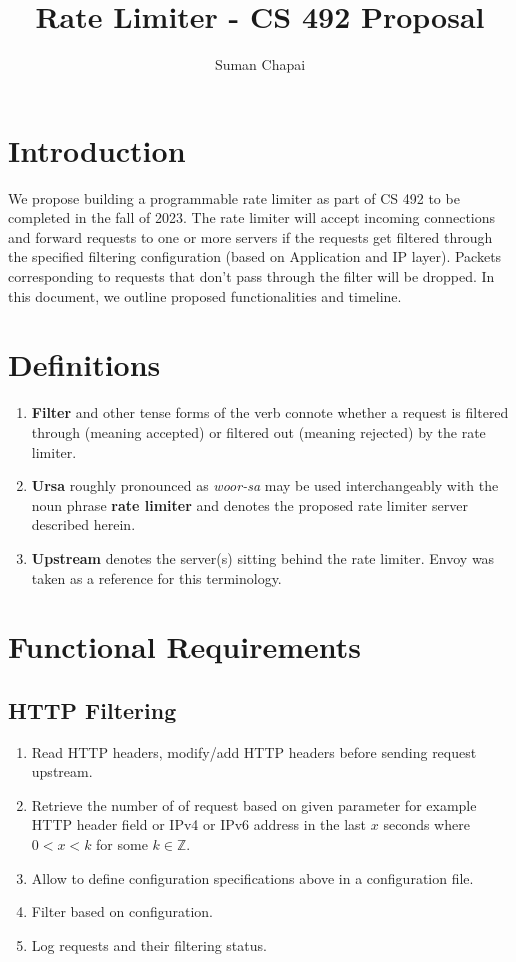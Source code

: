 \documentclass{article}
\author{Suman Chapai}
\title{Rate Limiter - CS 492 Proposal}
\newcommand*{\Z}[0]{\mathbb{Z}}
\begin{document}
\maketitle



%
%
\section{Introduction}
We propose building a programmable rate limiter as part of CS 492 to be
completed in the fall of 2023. The rate limiter will accept incoming connections
and forward requests to one or more servers if the requests get filtered through
the specified filtering configuration (based on Application and IP layer).
Packets corresponding to requests that don't pass through the filter will be
dropped. In this document, we outline proposed functionalities and timeline.


%
%
\section{Definitions}
\begin{enumerate}
    \item
          \textbf{Filter} and other tense forms of the verb connote whether a
          request is filtered through (meaning accepted) or filtered out
          (meaning rejected) by the rate limiter.
    \item
          \textbf{Ursa} roughly pronounced as \textit{woor-sa} may be used
          interchangeably with the noun phrase \textbf{rate limiter} and denotes
          the proposed rate limiter server described herein.
    \item
          \textbf{Upstream} denotes the server(s) sitting behind the rate limiter.
          Envoy \cite{envoy} was taken as a reference for this terminology.
\end{enumerate}

%
%
\section{Functional Requirements}


\subsection{HTTP Filtering}
\begin{enumerate}
    \item
          Read HTTP headers, modify/add HTTP headers before sending request upstream.
    \item
          Retrieve the number of of request based on given parameter for example
          HTTP header field or IPv4 or IPv6 address in the last $x$ seconds where
          $0 < x < k$ for some $k \in \Z$.
    \item
          Allow to define configuration specifications above in a configuration file.
    \item
          Filter based on configuration.
    \item
          Log requests and their filtering status.
\end{enumerate}
\end{document}
